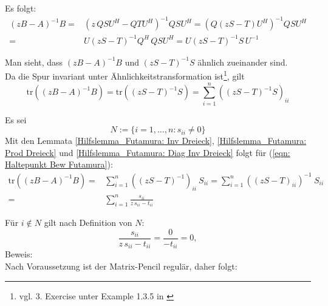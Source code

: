 \documentclass[a4paper,12pt]{report}
\newcommand{\tr}{\text{tr}}
\newcommand{\inv}{^{-1}}
\newcommand{\1}{\mathds{1}}
\theoremstyle{plain} %
\theoremstyle{definition} %
\theoremstyle{remark}
\begin{document}

            Es folgt:
            \begin{align*}
                  (zB-A)\inv B =& (z\,QSU^H-QTU^H)\inv QSU^H = (Q(zS-T)U^H)\inv QSU^H \\
                  =& U(zS-T)\inv Q^H\,QSU^H = U(zS-T)\inv S\,U\inv
            \end{align*}

            Man sieht, dass $(zB-A)\inv B$ und  $(zS-T)\inv S$ ähnlich zueinander sind.\\
            Da die Spur invariant unter Ähnlichkeitstransformation ist\footnote{vgl. 3. Exercise unter Example 1.3.5 in \cite{matrixSpur}}, gilt
            \begin{equation}
                  \label{eqn: Haltepunkt Bew Futamura}
                  \tr((zB-A)\inv B) = \tr((zS-T)\inv S) = \sum_{i=1}^{n}((zS-T)\inv S)_{ii}
            \end{equation}

            Es sei $$N:=\{i=1,\dots,n: s_{ii}\ne 0\}$$
            Mit den Lemmata \ref{Hilfslemma_Futamura: Inv Dreieck}, \ref{Hilfslemma_Futamura: Prod Dreieck} und
            \ref{Hilfslemma_Futamura: Diag Inv Dreieck} folgt für (\ref{eqn: Haltepunkt Bew Futamura}):
            \begin{align*}
                  \tr((zB-A)\inv B) =& \sum_{i=1}^{n}((zS-T)\inv)_{ii}\ S_{ii} = \sum_{i=1}^{n}((zS-T)_{ii})\inv\ S_{ii}\\
                  =& \sum_{i=1}^{n}\frac{s_{ii}}{z\,s_{ii}-t_{ii}}
            \end{align*}

            Für $i\notin N$ gilt nach Definition von $N$:
            $$\frac{s_{ii}}{z\,s_{ii}-t_{ii}} = \frac 0 {-t_{ii}} = 0,$$
            Beweis:\\
            Nach Voraussetzung ist der Matrix-Pencil regulär, daher folgt:
\end{document}
